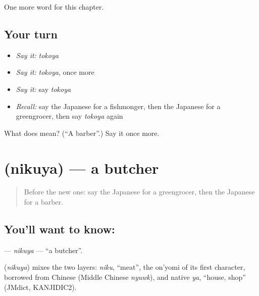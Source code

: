 \begin{grammarlens}[title={What you've built}]
One more word for this chapter.
\end{grammarlens}

\subsection*{Your turn}
\begin{itemize}
\raggedright
  \item \emph{Say it:} \emph{tokoya}
  \item \emph{Say it:} \emph{tokoya}, once more
  \item \emph{Say it:} say \emph{tokoya}
  \item \emph{Recall:} say the Japanese for a fishmonger, then the Japanese for a greengrocer, then say \emph{tokoya} again
\end{itemize}

\begin{tcolorbox}[breakable,colback=teal!4,colframe=teal!35!black,title={Before you move on}]
What does  mean? (\textquotedblleft{}A barber\textquotedblright{}.) Say it once more.
\end{tcolorbox}
\section[\texorpdfstring{\ja{にくや} (nikuya)}{にくや (nikuya)}]{ (nikuya) — a butcher}

\label{lesson:JA-C119-nikuya}



\begin{quote}
Before the new one: say the Japanese for a greengrocer, then the Japanese for a barber.
\end{quote}

\subsection*{You'll want to know: }
\textbf{} — \emph{nikuya} — \textquotedblleft{}a butcher\textquotedblright{}.

\begin{cousinweb}
\textbf{} (\emph{nikuya}) mixes the two layers: \emph{niku}, \textquotedblleft{}meat\textquotedblright{}, the on'yomi of its first character, borrowed from Chinese (Middle Chinese \emph{nyuwk}), and native \emph{ya}, \textquotedblleft{}house, shop\textquotedblright{} (JMdict, KANJIDIC2).
\end{cousinweb}

